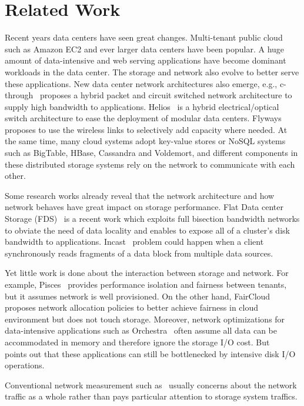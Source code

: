 \section{Related Work}
Recent years data centers have seen great changes. Multi-tenant public cloud such as Amazon EC2 and ever larger data centers have been popular. A huge amount of data-intensive and web serving applications have become dominant workloads in the data center. The storage and network also evolve to better serve these applications. New data center network architectures also emerge, e.g., c-through~\cite{c-through} proposes a hybrid packet and circuit switched network architecture to supply high bandwidth to applications. Helios~\cite{Helios} is a hybrid electrical/optical switch architecture to ease the deployment of modular data centers. Flyways~\cite{flyaways} proposes to use the wireless links to selectively add capacity where needed. At the same time, many cloud systems adopt key-value stores or NoSQL systems such as BigTable, HBase, Cassandra and Voldemort, and different components in these distributed storage systems rely on the network to communicate with each other.

Some research works already reveal that the network architecture and how network behaves have great impact on storage performance. Flat Data center Storage (FDS)~\cite{flat-datacenter-storage} is a recent work which exploits full bisection bandwidth networks to obviate the need of data locality and enables to expose all of a cluster's disk bandwidth to applications. Incast~\cite{incast} problem could happen when a client synchronously reads fragments of a data block from multiple data sources.

Yet little work is done about the interaction between storage and network. For example, Pisces~\cite{pisces} provides performance isolation and fairness between tenants, but it assumes network is well provisioned. On the other hand, FairCloud~\cite{faircloud} proposes network allocation policies to better achieve fairness in cloud environment but does not touch storage. Moreover, network optimizations for data-intensive applications such as Orchestra~\cite{orchestra} often assume all data can be accommodated in memory and therefore ignore the storage I/O cost. But ~\cite{c-through} points out that these applications can still be bottlenecked by intensive disk I/O operations.

Conventional network measurement such as~\cite{wild} usually concerns about the network traffic as a whole rather than pays particular attention to storage system traffics.
